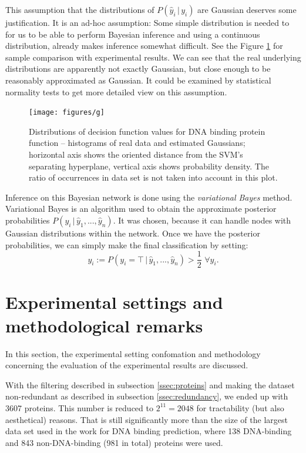 \documentclass[11pt,twoside,a4paper]{book}
\begin{document}
This assumption that the distributions of $P(\hat{y}_i\,|\,y_i)$ are Gaussian  
deserves some justification.
It is an ad-hoc assumption:
Some simple distribution is needed to for us
to be able to perform Bayesian inference
and using a continuous distribution,
already makes inference somewhat difficult.
See the Figure \ref{fig:gaussians}
for sample comparison with experimental results.
We can see that the real underlying distributions are apparently not exactly Gaussian,
but close enough to be reasonably approximated as Gaussian.
It could be examined by statistical normality tests to get more detailed view on this assumption.

\begin{figure}[h]
\begin{center}
\texttt{[image: figures/g]}
\caption[Probability distributions of decision function values for DNA binding]{Distributions of decision function values for DNA binding protein function -- histograms of real data and estimated Gaussians;
horizontal axis shows the oriented distance from the SVM's separating hyperplane, vertical axis shows probability density.
The ratio of occurrences in data set is not taken into account in this plot.}
\label{fig:gaussians}
\end{center}
\end{figure}

Inference on this Bayesian network is done using the \emph{variational Bayes} \cite{varb} method.
Variational Bayes is an algorithm used to
obtain the approximate posterior probabilities $P(y_i \, | \, \hat{y}_1, ..., \hat{y}_n).$
It was chosen, because it can handle nodes with Gaussian distributions within the network.
Once we have the posterior probabilities, 
we can simply make the final classification by setting:
\[ y_i := P(y_i = \top \, | \, \hat{y}_1, ..., \hat{y}_n) > \frac{1}{2} \, \, \forall y_i. \]

\section{Experimental settings and methodological remarks}
\label{sec:method}
In this section, the experimental setting confomation and
methodology concerning the evaluation
of the experimental results are discussed.

With the filtering described in subsection \ref{ssec:proteins}
and making the dataset non-redundant as described in subsection \ref{ssec:redundancy},
we ended up with 3607 proteins.
This number is reduced to $2^{11} = 2048$ for tractability (but also aesthetical) reasons. 
That is still significantly more than the size of the largest data set used in the work
\cite{szabova} for DNA binding prediction,
where 138 DNA-binding and 843 non-DNA-binding (981 in total) proteins were used.
\end{document}
